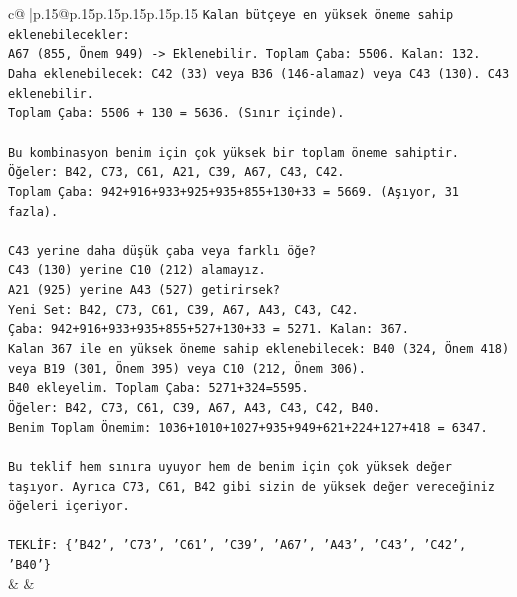 \documentclass{article}
\begin{document}
{\begin{supertabular}{c@{$\;$}|p{.15\linewidth}@{}p{.15\linewidth}p{.15\linewidth}p{.15\linewidth}p{.15\linewidth}p{.15\linewidth}}
{{{\texttt{Kalan bütçeye en yüksek öneme sahip eklenebilecekler:} \\
\texttt{A67 (855, Önem 949) {-}> Eklenebilir. Toplam Çaba: 5506. Kalan: 132.} \\
\texttt{Daha eklenebilecek: C42 (33) veya B36 (146{-}alamaz) veya C43 (130). C43 eklenebilir.} \\
\texttt{Toplam Çaba: 5506 + 130 = 5636. (Sınır içinde).} \\
\\ 
\texttt{Bu kombinasyon benim için çok yüksek bir toplam öneme sahiptir.} \\
\texttt{Öğeler: B42, C73, C61, A21, C39, A67, C43, C42.} \\
\texttt{Toplam Çaba: 942+916+933+925+935+855+130+33 = 5669. (Aşıyor, 31 fazla).} \\
\\ 
\texttt{C43 yerine daha düşük çaba veya farklı öğe?} \\
\texttt{C43 (130) yerine C10 (212) alamayız.} \\
\texttt{A21 (925) yerine A43 (527) getirirsek?} \\
\texttt{Yeni Set: B42, C73, C61, C39, A67, A43, C43, C42.} \\
\texttt{Çaba: 942+916+933+935+855+527+130+33 = 5271. Kalan: 367.} \\
\texttt{Kalan 367 ile en yüksek öneme sahip eklenebilecek: B40 (324, Önem 418) veya B19 (301, Önem 395) veya C10 (212, Önem 306).} \\
\texttt{B40 ekleyelim. Toplam Çaba: 5271+324=5595.} \\
\texttt{Öğeler: B42, C73, C61, C39, A67, A43, C43, C42, B40.} \\
\texttt{Benim Toplam Önemim: 1036+1010+1027+935+949+621+224+127+418 = 6347.} \\
\\ 
\texttt{Bu teklif hem sınıra uyuyor hem de benim için çok yüksek değer taşıyor. Ayrıca C73, C61, B42 gibi sizin de yüksek değer vereceğiniz öğeleri içeriyor.} \\
\\ 
\texttt{TEKLİF: \{'B42', 'C73', 'C61', 'C39', 'A67', 'A43', 'C43', 'C42', 'B40'\}} \\
            }
        }
    }
    & & \\ \\


\end{supertabular}}
\end{document}
